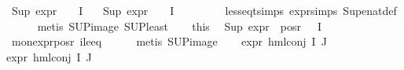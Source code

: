 \begin{isabellebody}
\ {\isachardoublequoteopen}Sup\ {\isacharparenleft}{\kern0pt}{\isacharparenleft}{\kern0pt}expr{\isacharunderscore}{\kern0pt}{}\ {\isasymcirc}\ {\isasymPhi}{\isacharparenright}{\kern0pt}\ {\isacharbackquote}{\kern0pt}\ I{\isacharparenright}{\kern0pt}\ {\isasymle}\ {}{\isachardoublequoteclose}\isanewline
\ {\isachardoublequoteopen}Sup\ {\isacharparenleft}{\kern0pt}{\isacharparenleft}{\kern0pt}expr{\isacharunderscore}{\kern0pt}{}\ {\isasymcirc}\ {\isasymPhi}{\isacharparenright}{\kern0pt}\ {\isacharbackquote}{\kern0pt}\ I{\isacharparenright}{\kern0pt}\ {\isasymle}\ {}{\isachardoublequoteclose}\isanewline
\ \ \ \ \isamarkupfalse%
\ {}{\isacharparenleft}{\kern0pt}{}{\isacharparenright}{\kern0pt}\ less{\isacharunderscore}{\kern0pt}eq{\isacharunderscore}{\kern0pt}t{\isachardot}{\kern0pt}simps\ expr{\isachardot}{\kern0pt}simps\ Sup{\isacharunderscore}{\kern0pt}enat{\isacharunderscore}{\kern0pt}def\isanewline
\ \ \ \ \isamarkupfalse%
\ {\isacharparenleft}{\kern0pt}metis\ SUP{\isacharunderscore}{\kern0pt}image\ SUP{\isacharunderscore}{\kern0pt}least{\isacharparenright}{\kern0pt}{\isacharplus}{\kern0pt}\isanewline
\ \ \isamarkupfalse%
\ this{\isacharparenleft}{\kern0pt}{}{\isacharparenright}{\kern0pt}\ \isamarkupfalse%
\ {\isachardoublequoteopen}Sup\ {\isacharparenleft}{\kern0pt}expr{\isacharunderscore}{\kern0pt}{}\ {\isacharbackquote}{\kern0pt}\ {\isacharparenleft}{\kern0pt}pos{\isacharunderscore}{\kern0pt}r\ {\isacharparenleft}{\kern0pt}{\isasymPhi}\ {\isacharbackquote}{\kern0pt}\ I{\isacharparenright}{\kern0pt}{\isacharparenright}{\kern0pt}{\isacharparenright}{\kern0pt}\ {\isasymle}\ {}{\isachardoublequoteclose}\isanewline
\ \ \ \ \isamarkupfalse%
\ mon{\isacharunderscore}{\kern0pt}expr{\isacharunderscore}{\kern0pt}{}{\isacharunderscore}{\kern0pt}pos{\isacharunderscore}{\kern0pt}r\ ile{}{\isacharunderscore}{\kern0pt}eq\isanewline
\ \ \ \ \isamarkupfalse%
\ {\isacharparenleft}{\kern0pt}metis\ SUP{\isacharunderscore}{\kern0pt}image{\isacharparenright}{\kern0pt}\isanewline
\ \ \isamarkupfalse%
\ {\isachardoublequoteopen}expr{\isacharunderscore}{\kern0pt}{}\ {\isacharparenleft}{\kern0pt}hml{\isacharunderscore}{\kern0pt}conj\ I\ J\ {\isasymPhi}{\isacharparenright}{\kern0pt}\ {\isasymle}\ {}{\isachardoublequoteclose}\isanewline
{}expr{\isacharunderscore}{\kern0pt}{}\ {\isacharparenleft}{\kern0pt}hml{\isacharunderscore}{\kern0pt}conj\ I\ J\ {\isasymPhi}{\isacharparenright}{\kern0pt}\ {\isasymle}\ {}{\isachardoublequoteclose}\isanewline

\end{isabellebody}
